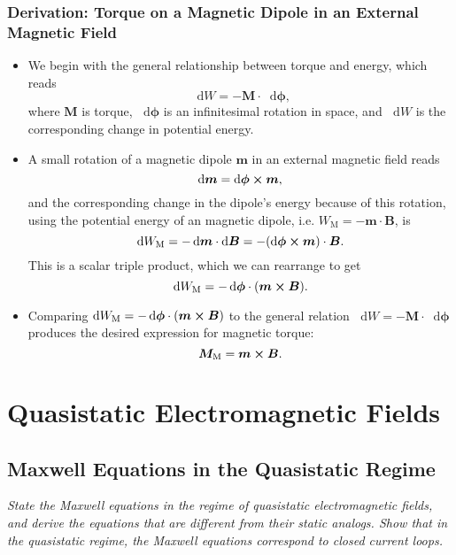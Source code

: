 \documentclass[11pt, a4paper]{article}
\newcommand{\diff}{\mathop{}\!\mathrm{d}} %
\renewcommand{\vec}[1]{\bm{#1}} %
\newcommand{\B}{\vec{B}} %
\newcommand{\M}{\vec{M}}  %
\newcommand{\m}{\vec{m}}  %
\begin{document}
\subsubsection{Derivation: Torque on a Magnetic Dipole in an External Magnetic Field}
\begin{itemize}
	\item We begin with the general relationship between torque and energy, which reads
	\begin{equation*}
		\diff W = - \vec{M} \cdot \diff \vec{\phi},
	\end{equation*}
    where $ \M $ is torque, $ \diff \vec{\phi} $ is an infinitesimal rotation in space, and $ \diff W $ is the corresponding change in potential energy.
	
	\item A small rotation of a magnetic dipole $ \m $ in an external magnetic field reads
	\begin{equation*}
		\diff \vec{m} = \diff \vec{\phi} \cross \m,
	\end{equation*}
	and the corresponding change in the dipole's energy because of this rotation, using the potential energy of an magnetic dipole, i.e. $ W_{\text{M}} = - \m \cdot \B $, is
	\begin{equation*}
		\diff W_{\text{M}} = - \diff \m \cdot \diff \B = - (\diff \vec{\phi} \cross \m)\cdot \B.
	\end{equation*}
	This is a scalar triple product, which we can rearrange to get
	\begin{equation*}
		\diff W_{\text{M}} = - \diff \vec{\phi} \cdot (\m \cross \B).
	\end{equation*}
	

    \item Comparing $ \diff W_{\text{M}} = - \diff \vec{\phi} \cdot (\m \cross \B) $ to the general relation $ \diff W = - \vec{M} \cdot \diff \vec{\phi} $ produces the desired expression for magnetic torque:
	\begin{equation*}
		\vec{M}_{\text{M}} = \m \cross \B.
	\end{equation*}

\end{itemize}

    
\newpage
\section{Quasistatic Electromagnetic Fields}

\subsection{Maxwell Equations in the Quasistatic Regime}
\textit{State the Maxwell equations in the regime of quasistatic electromagnetic fields, and derive the equations that are different from their static analogs. Show that in the quasistatic regime, the Maxwell equations correspond to closed current loops.}
\end{document}
